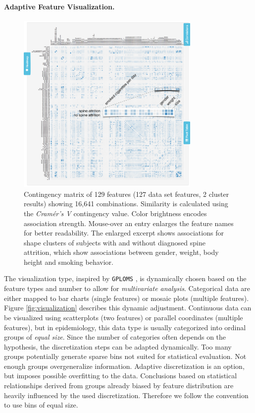 \documentclass[journal]{style/vgtc} 			          %
\begin{document}
\paragraph{Adaptive Feature Visualization.} \label{sec:AdaptiveFeatureVisualization}
\begin{figure}[htb]
 \centering
 \includegraphics[width=3.5in]{figures/similarity_matrix}
 \caption{Contingency matrix of 129 features (127 data set features, 2 cluster results) showing 16,641 combinations.
 Similarity is calculated using the \emph{Cram\'{e}r's V} contingency value.
 Color brightness encodes association strength.
 Mouse-over an entry enlarges the feature names for better readability.
 The enlarged excerpt shows associations for shape clusters of subjects with and without diagnosed spine attrition, which show associations between gender, weight, body height and smoking behavior.
 }
 \label{fig:similarity}
\end{figure}
The visualization type, inspired by \texttt{GPLOMS} \cite{GPLOMS, Francois2013}, is dynamically chosen based on the feature types and number to allow for \emph{multivariate analysis}.
%
Categorical data are either mapped to bar charts (single features) or mosaic plots (multiple features).
%
Figure \ref{fig:visualization} describes this dynamic adjustment.
%
Continuous data can be visualized using scatterplots (two features) or parallel coordinates (multiple features), but in epidemiology, this data type is usually categorized into ordinal groups of \emph{equal size}.
%
Since the number of categories often depends on the hypothesis, the discretization steps can be adapted dynamically.
%
Too many groups potentially generate sparse bins not suited for statistical evaluation.
%
Not enough groups overgeneralize information.
%
Adaptive discretization is an option, but imposes possible overfitting to the data.
%
Conclusions based on statistical relationships derived from groups already biased by feature distribution are heavily influenced by the used discretization.
%
Therefore we follow the convention to use bins of equal size.
\end{document}
